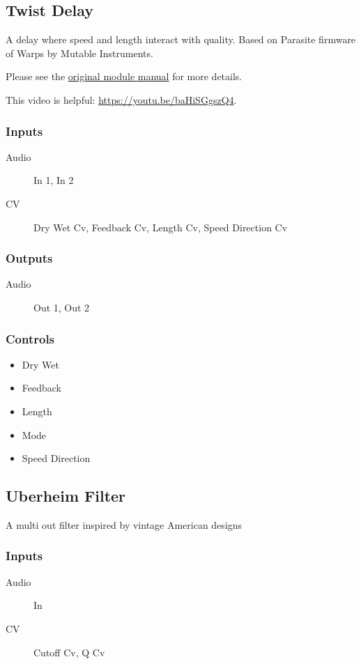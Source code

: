 \subsection{Twist Delay}

A delay where speed and length interact with quality. Based on Parasite firmware of Warps by Mutable Instruments.



Please see the \href{https://mqtthiqs.github.io/parasites/warps.html}{original module manual} for more details.

This video is helpful: \url{https://youtu.be/baHiSGgszQ4}.

\subsubsection{Inputs}
\begin{description}
\item [Audio] In 1, In 2
\item [CV] Dry Wet Cv, Feedback Cv, Length Cv, Speed Direction Cv
\end{description}

\subsubsection{Outputs}
\begin{description}
\item [Audio] Out 1, Out 2
\end{description}

\subsubsection{Controls}
\begin{itemize}
\item Dry Wet
\item Feedback
\item Length
\item Mode
\item Speed Direction
\end{itemize}

\subsection{Uberheim Filter}

A multi out filter inspired by vintage American designs



\subsubsection{Inputs}
\begin{description}
\item [Audio] In
\item [CV] Cutoff Cv, Q Cv
\end{description}

